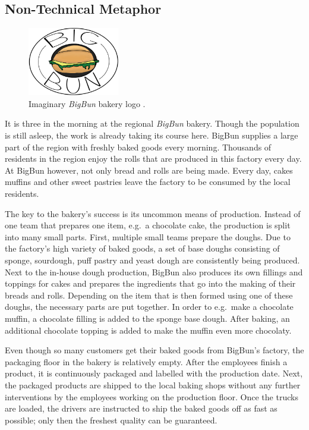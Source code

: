 
\subsection{Non-Technical Metaphor}%
\begin{figure}
  \begin{center}
    \includegraphics[width=4cm]{images/figures/big_bun_logo.png}
  \end{center}
  \caption{Imaginary \textit{BigBun} bakery logo
  \autocite{WiesemannImaginaryBigBunbakery2019}.}%
  \label{fig:big_bun_logo}
\end{figure}
It is three in the morning at the regional \textit{BigBun} bakery. Though the
population is still asleep, the work is already taking its course here.
BigBun supplies a large part of the region with freshly baked goods every
morning. Thousands of residents in the region enjoy the rolls that are produced
in this factory every day. At BigBun however, not only bread and rolls are
being made. Every day, cakes muffins and other sweet pastries leave the factory
to be consumed by the local residents.

The key to the bakery's success is its uncommon means of production. Instead of
one team that prepares one item, e.g.\ a chocolate cake, the production is
split into many small parts. First, multiple small teams prepare the doughs.
Due to the factory's high variety of baked goods, a set of base doughs
consisting of sponge, sourdough, puff pastry and yeast dough are consistently
being produced. Next to the in-house dough production, BigBun also produces its
own fillings and toppings for cakes and prepares the ingredients that go into
the making of their breads and rolls. Depending on the item that is then formed
using one of these doughs, the necessary parts are put together. In order to
e.g.\ make a chocolate muffin, a chocolate filling is added to the sponge base
dough. After baking, an additional chocolate topping is added to make the
muffin even more chocolaty.

Even though so many customers get their baked goods from BigBun's factory, the
packaging floor in the bakery is relatively empty. After the employees finish a
product, it is continuously packaged and labelled with the production date.
Next, the packaged products are shipped to the local baking shops without any
further interventions by the employees working on the production floor. Once
the trucks are loaded, the drivers are instructed to ship the baked goods off
as fast as possible; only then the freshest quality can be guaranteed.

